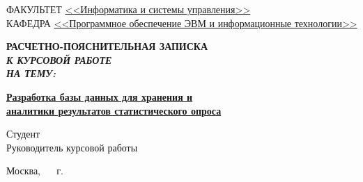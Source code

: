 \begin{titlepage}
\vspace{\baselineskip}

\fontsize{12pt}{\baselineskip}\selectfont
\noindent ФАКУЛЬТЕТ \uline{<<Информатика и системы управления>>\hfill} \\
\noindent КАФЕДРА \uline{<<Программное обеспечение ЭВМ и информационные технологии>>\hfill} \\

\vspace{\baselineskip}
\begin{center}
	\fontsize{22pt}{\baselineskip}\selectfont \textbf{РАСЧЕТНО-ПОЯСНИТЕЛЬНАЯ ЗАПИСКА}\\
	\fontsize{20pt}{\baselineskip}\selectfont \textbf{\textit{К КУРСОВОЙ РАБОТЕ}}\\
	\fontsize{20pt}{0.7\baselineskip}\selectfont \textbf{\textit{НА ТЕМУ:}}
\end{center}
\newcommand{\termtitle}{\textbf{Разработка базы данных для хранения}
 и аналитики результатов статистического опроса}

\fontsize{20pt}{\baselineskip}\selectfont
\noindent\uline{\textbf{Разработка базы данных для хранения и}\hfill} \\
\fontsize{20pt}{\baselineskip}\selectfont\uline{\textbf{аналитики результатов статистического опроса}\hfill}

\vspace{5cm}

\fontsize{12pt}{0.3\baselineskip}\selectfont
\noindent Студент~~~\uline{} \hfill 
\uline{}~~~
\uline{}\\
Руководитель курсовой работы\hfill 
\uline{}~~~
\uline{}\\

\mbox{}
\vfill

\begin{center}
	\vfill
	Москва, ~\the\year
	~г.
\end{center}
\restoregeometry

\end{titlepage}
